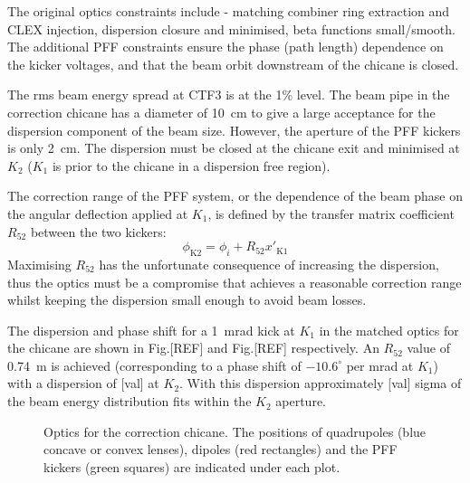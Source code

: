 The original optics constraints include - matching combiner ring extraction and 
CLEX injection, dispersion closure and minimised, beta functions small/smooth. 
The additional PFF constraints ensure the phase (path length) dependence on the 
kicker voltages, and that the beam orbit downstream of the chicane is closed.

The rms beam energy spread at CTF3 is at the 1\% level. The beam pipe in the 
correction chicane has a diameter of 10~cm to give a large acceptance for the 
dispersion component of the beam size. However, the aperture of the PFF kickers 
is only 2~cm. The dispersion must be closed at the chicane exit and minimised 
at \(K_2\) (\(K_1\) is prior to the chicane in a dispersion free region). 

The correction range of the PFF system, or the dependence of the beam phase on 
the angular deflection applied at \(K_1\), is defined by the transfer matrix 
coefficient \(R_{52}\) between the two kickers:
\begin{equation}
\phi_{\mathrm{K2}} = \phi_i + R_{52}x'_{\mathrm{K1}}
\end{equation}
Maximising \(R_{52}\) has the 
unfortunate consequence of increasing the dispersion, thus the optics must be a 
compromise that achieves a reasonable
correction range whilst keeping the dispersion small enough to avoid beam 
losses.

The dispersion and phase shift for a 1~mrad kick at \(K_1\) in the matched 
optics for the chicane are shown in Fig.[REF] and Fig.[REF] respectively. An 
\(R_52\) value of 0.74~m 
is achieved (corresponding to a phase shift of \(-10.6^\circ\) per mrad at 
\(K_1\)) with 
a dispersion of [val] at \(K_2\). With this dispersion approximately [val] 
sigma of the beam energy distribution fits within the \(K_2\) aperture.

\begin{figure*}
 \centering
 \hfill



  \caption{\label{f:opticsPlots}Optics for the correction chicane. The 
  positions of quadrupoles (blue concave or convex lenses), dipoles (red 
  rectangles) and the PFF kickers (green squares) are indicated under each 
  plot.}

\end{figure*}

